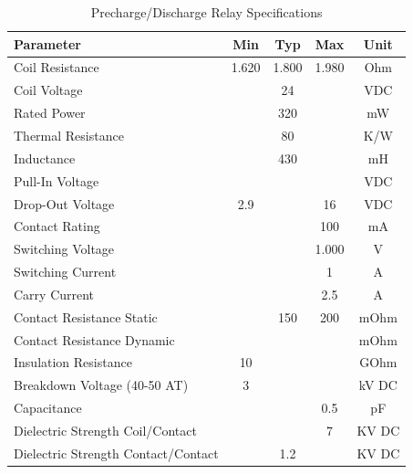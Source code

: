 \begin{table}[H]
    \centering
    \begin{tabular}{|l|c|c|c|c|}
    \hline
    \textbf{Parameter} & \textbf{Min} & \textbf{Typ} & \textbf{Max} & \textbf{Unit} \\
    \hline
    Coil Resistance & 1.620 & 1.800 & 1.980 & Ohm \\
    Coil Voltage & & 24 & & VDC \\
    Rated Power & & 320 & & mW \\
    Thermal Resistance & & 80 & & K/W \\
    Inductance & & 430 & & mH \\
    Pull-In Voltage & & & & VDC \\
    Drop-Out Voltage & 2.9 & & 16 & VDC \\
    Contact Rating & & & 100 & mA \\
    Switching Voltage & & & 1.000 & V \\
    Switching Current & & & 1 & A \\
    Carry Current & & & 2.5 & A \\
    Contact Resistance Static & & 150 & 200 & mOhm \\
    Contact Resistance Dynamic & & & & mOhm \\
    Insulation Resistance & 10 & & & GOhm \\
    Breakdown Voltage (40-50 AT) & 3 & & & kV DC \\
    Capacitance & & & 0.5 & pF \\
    Dielectric Strength Coil/Contact & & & 7 & KV DC \\
    Dielectric Strength Contact/Contact & & 1.2 & & KV DC \\
    \hline
    \end{tabular}
    \caption{Precharge/Discharge Relay Specifications}
    \label{tab:precharge-relay-specs}
\end{table}


